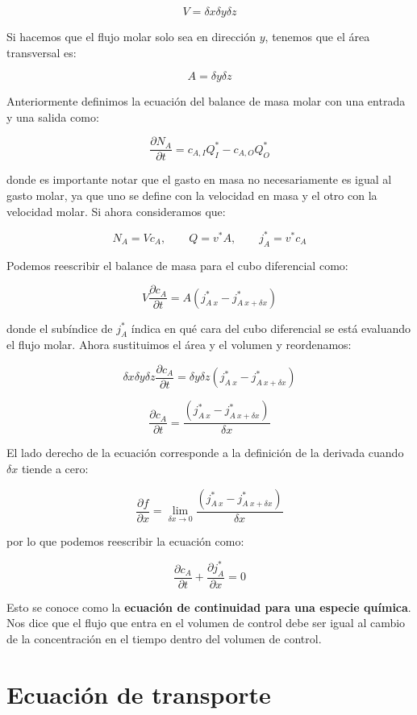 \documentclass[11pt]{article}
\begin{document}
\[ V = \delta x \delta y \delta z \]

Si hacemos que el flujo molar solo sea en dirección \( y \), tenemos que el área transversal es:

\[ A = \delta y \delta z \]

Anteriormente definimos la ecuación del balance de masa molar con una entrada y una salida como:

\[ \frac{ \partial N_A }{ \partial t } = c_{ A,I } Q_I^* - c_{ A,O } Q_O^* \]

donde es importante notar que el gasto en masa no necesariamente es igual al gasto molar, ya que uno se define con la velocidad en masa y el otro con la velocidad molar. Si ahora consideramos que:

\[ N_A = V c_A, \qquad Q = v^{*} A, \qquad j_A^* = v^* c_A \]

Podemos reescribir el balance de masa para el cubo diferencial como:

\[ V \frac{ \partial c_A }{ \partial t } = A \left( j_{ A \ x }^* - j_{ A \ x + \delta x }^* \right) \]

donde el subíndice de \( j_A^* \) índica en qué cara del cubo diferencial se está evaluando el flujo molar. Ahora sustituimos el área y el volumen y reordenamos:

\[ \delta x \delta y \delta z \frac{ \partial c_A }{ \partial t } = \delta y \delta z \left( j_{ A \ x }^* -  j_{ A \ x + \delta x }^* \right) \]

\[ \frac{ \partial c_A }{ \partial t } = \frac{ \left( j_{ A \ x }^* - j_{ A \ x + \delta x }^* \right) }{ \delta x } \]

El lado derecho de la ecuación corresponde a la definición de la derivada cuando \( \delta x \) tiende a cero:

\[ \frac{ \partial f }{ \partial x } = \lim\limits_{ \delta x \to 0 } \frac{ \left( j_{ A \ x }^* -  j_{ A \ x + \delta x }^* \right) }{ \delta x } \]

por lo que podemos reescribir la ecuación como:

\[ \boxed{ \frac{ \partial c_A }{ \partial t } + \frac{ \partial j_A^* }{ \partial x } = 0 } \]

Esto se conoce como la \textbf{ecuación de continuidad para una especie química}. Nos dice que el flujo que entra en el volumen de control debe ser igual al cambio de la concentración en el tiempo dentro del volumen de control.

\section{Ecuación de transporte}
\end{document}
